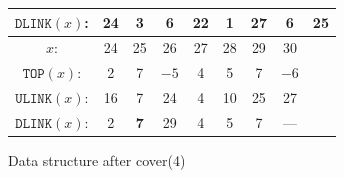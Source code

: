 \documentclass[a4paper,landscape,11pt]{article}
\begin{document}
\begin{figure}[H]
\begin{minipage}[t]{0.48\linewidth}
\begin{tabular}{c c c c c c c c c}
			$\texttt{DLINK}(x)$: & 24  & 3          & 6          & 22         & 1  & 27          & 6    & 25          \\
			\hline
			$x$:                 & 24  & 25         & 26         & 27         & 28 & 29          & 30   &             \\
			$\texttt{TOP}(x)$:   & 2   & 7          & $-5$       & 4          & 5  & 7           & $-6$ &             \\
			$\texttt{ULINK}(x)$: & 16  & 7          & 24         & 4          & 10 & 25          & 27   &             \\
			$\texttt{DLINK}(x)$: & 2   & \textbf{7} & 29         & 4          & 5  & 7           & ---  &             \\
		\end{tabular}
		\label{tab:mem_layout_after_cover_4}
	\end{minipage}
	\hfill
	\begin{minipage}[t]{0.48\linewidth}
		\centering
		\caption{Data structure after cover(4)}
		\label{fig:data_structure_after_cover_4}
	\end{minipage}
\end{figure}
\end{document}
